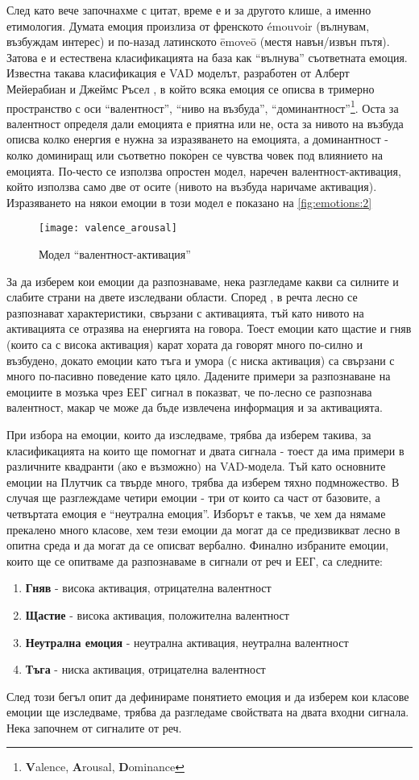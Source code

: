 \documentclass[main.tex]{subfiles}
\begin{document}
След като вече започнахме с цитат, време е и за другото клише, а именно етимология. Думата емоция произлиза от френското émouvoir (вълнувам, възбуждам интерес) и по-назад латинското ēmoveō (местя навън/извън пътя). Затова е и естествена класификацията на база как ``вълнува'' съответната емоция. Известна такава класификация е VAD моделът, разработен от Алберт Мейерабиан и Джеймс Ръсел \cite{pad}, в който всяка емоция се описва в тримерно пространство с оси ``валентност'', ``ниво на възбуда'', ``доминантност''\footnote{\textbf{V}alence, \textbf{A}rousal, \textbf{D}ominance}. Оста за валентност определя дали емоцията е приятна или не, оста за нивото на възбуда описва колко енергия е нужна за изразяването на емоцията, а доминантност - колко доминиращ или съответно пок\`{о}рен се чувства човек под влиянието на емоцията. По-често се използва опростен модел, наречен валентност-активация, който използва само две от осите (нивото на възбуда наричаме активация). Изразяването на някои емоции в този модел е показано на \autoref{fig:emotions:2}
\begin{figure}[ht]%
    \centering
    \texttt{[image: valence\_arousal]}
    \caption{Модел ``валентност-активация''}
    \label{fig:emotions:2}
\end{figure}

За да изберем кои емоции да разпознаваме, нека разгледаме какви са силните и слабите страни на двете изследвани области.
Според \cite{survey}, в речта лесно се разпознават характеристики, свързани с активацията, тъй като нивото на активацията се отразява на енергията на говора. Тоест емоции като щастие и гняв (които са с висока активация) карат хората да говорят много по-силно и възбудено, докато емоции като тъга и умора (с ниска активация) са свързани с много по-пасивно поведение като цяло.
Дадените примери за разпознаване на емоциите в мозъка чрез ЕЕГ сигнал в \cite{brain_survey} показват, че по-лесно се разпознава валентност, макар че може да бъде извлечена информация и за активацията.

При избора на емоции, които да изследваме, трябва да изберем такива, за класификацията на които ще помогнат и двата сигнала - тоест да има примери в различните квадранти (ако е възможно) на VAD-модела. Тъй като основните емоции на Плутчик са твърде много, трябва да изберем тяхно подмножество. В случая ще разглеждаме четири емоции - три от които са част от базовите, а четвъртата емоция е ``неутрална емоция''. Изборът е такъв, че хем да нямаме прекалено много класове, хем тези емоции да могат да се предизвикват лесно в опитна среда и да могат да се описват вербално.
Финално избраните емоции, които ще се опитваме да разпознаваме в сигнали от реч и ЕЕГ, са следните:
\begin{enumerate}
    \item \textbf{Гняв} - висока активация, отрицателна валентност
    \item \textbf{Щастие} - висока активация, положителна валентност
    \item \textbf{Неутрална емоция} - неутрална активация, неутрална валентност
    \item \textbf{Тъга} - ниска активация, отрицателна валентност
\end{enumerate}

След този бегъл опит да дефинираме понятието емоция и да изберем кои класове емоции ще изследваме, трябва да разгледаме свойствата на двата входни сигнала. Нека започнем от сигналите от реч. 
\end{document}
